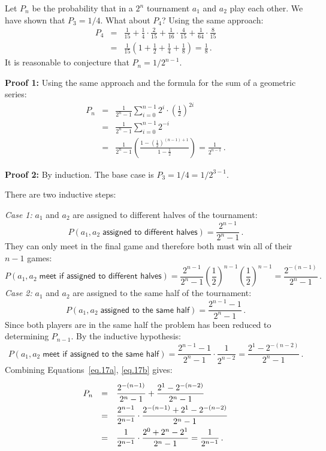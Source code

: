 Let $P_n$ be the probability that in a $2^n$ tournament $a_1$ and $a_2$ play each other. We have shown that $P_3=1/4$. What about $P_4$? Using the same approach:
\begin{eqnarray*}
P_4 &=& \frac{1}{15} + \frac{1}{4}\cdot \frac{2}{15}  + \frac{1}{16}\cdot \frac{4}{15}  + \frac{1}{64}\cdot \frac{8}{15} \\
&=&\frac{1}{15}\left(1+\frac{1}{2}+\frac{1}{4}+\frac{1}{8}\right)=\frac{1}{8}\,.
\end{eqnarray*}
It is reasonable to conjecture that $P_n=1/2^{n-1}$.

\textbf{Proof 1:} Using the same approach and the formula for the sum of a geometric series:
\begin{eqnarray*}
P_n&=&\frac{1}{2^n-1}\sum_{i=0}^{n-1}2^i\cdot \left(\frac{1}{2}\right)^{2i}\\
&=&\frac{1}{2^n-1}\sum_{i=0}^{n-1}2^{-i}\\
&=&\frac{1}{2^n-1}
  \left(
    \frac{1-\left(\frac{1}{2}\right)^{(n-1)+1}}
         {1-\frac{1}{2}}
  \right)=\frac{1}{2^{n-1}}\,.
\end{eqnarray*}

\textbf{Proof 2:} By induction. The base case is $P_3=1/4=1/2^{3-1}$.

There are two inductive steps:

\textit{Case 1:} $a_1$ and $a_2$ are assigned to different halves of the tournament:
\[
P(a_1,a_2\;\textsf{assigned to different halves})=\frac{2^{n-1}}{2^n-1}\,.
\]
They can only meet in the final game and therefore both must win all of their $n-1$ games:
\begin{equation}\label{eq.17a}
P(a_1,a_2\;\textsf{meet if assigned to different halves})=\frac{2^{n-1}}{2^n-1} \left(\frac{1}{2}\right)^{n-1} \left(\frac{1}{2}\right)^{n-1}=\frac{2^{-(n-1)}}{2^n-1}\,.
\end{equation}
\textit{Case 2:} $a_1$ and $a_2$ are assigned to the same half of the tournament:
\[
P(a_1,a_2\;\textsf{assigned to the same half})=\frac{2^{n-1}-1}{2^n-1}\,.
\]
Since both players are in the same half the problem has been reduced to determining $P_{n-1}$. By the inductive hypothesis:
\begin{equation}\label{eq.17b}
P(a_1,a_2\;\textsf{meet if assigned to the same half})=\frac{2^{n-1}-1}{2^n-1}\cdot \frac{1}{2^{n-2}}=\frac{2^{1}-2^{-(n-2)}}{2^n-1}\,.
\end{equation}
Combining Equations~\ref{eq.17a}, \ref{eq.17b} gives:
\[
\renewcommand*{\arraystretch}{2.2}
\begin{array}{rcl}
P_n&=&\disfrac{2^{-(n-1)}}{2^n-1}+\disfrac{2^{1}-2^{-(n-2)}}{2^n-1}\\
&=&\disfrac{2^{n-1}}
        {2^{n-1}}\cdot 
   \disfrac{2^{-(n-1)}+2^{1}-2^{-(n-2)}}
        {2^n-1}\\
&=&\disfrac{1}
        {2^{n-1}}\cdot 
   \disfrac{2^0+2^n-2^1}
        {2^n-1}=\disfrac{1}{2^{n-1}}\,.
\end{array}
\]

